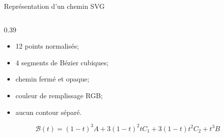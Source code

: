 \documentclass[11pt,aspectratio=169]{beamer}
\begin{document}
\begin{frame}{Représentation d'un chemin SVG}
\begin{columns}[T,onlytextwidth]
\begin{column}{0.39\textwidth}
      \begin{itemize}
        \item 12 points normalisés;
        \item 4 segments de Bézier cubiques;
        \item chemin fermé et opaque;
        \item couleur de remplissage RGB;
        \item aucun contour séparé.
      \end{itemize}

      \vspace{0.15cm}
      {\scriptsize
      \[
        \mathcal B(t)=(1-t)^3A+3(1-t)^2tC_1
        +3(1-t)t^2C_2+t^3B
      \]}
    \end{column}
  \end{columns}
\end{frame}
\end{document}
